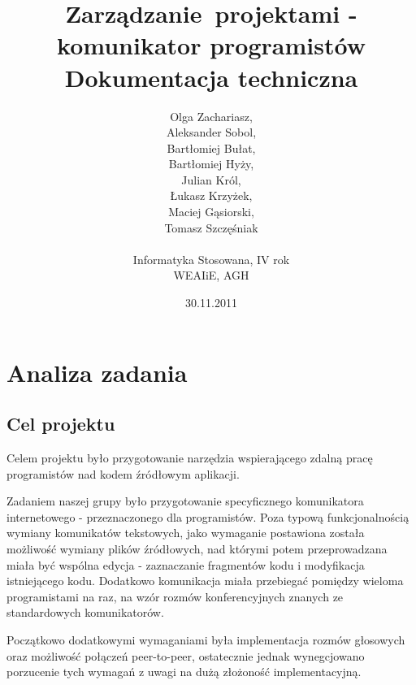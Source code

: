 \documentclass[polish,11pt,a4paper,twoside]{article}
\begin{document}
\pagestyle{fancy}
\fancyhf{} %
\fancyfoot[R]{\footnotesize \thepage}
\renewcommand{\headrulewidth}{0pt}
\renewcommand{\footrulewidth}{0pt}

\author{Olga Zachariasz,\\Aleksander Sobol,\\Bartłomiej Bułat,\\Bartłomiej Hyży,\\Julian Król,\\Łukasz Krzyżek,\\Maciej Gąsiorski,\\Tomasz Szczęśniak\\\\Informatyka Stosowana, IV rok\\WEAIiE, AGH}
\date{30.11.2011}
\title{Zarządzanie~projektami - komunikator programistów\\Dokumentacja techniczna}
\maketitle

\tableofcontents
\pagebreak

\thispagestyle{fancy}

\section{Analiza zadania}

\subsection{Cel projektu}

Celem projektu było przygotowanie narzędzia wspierającego zdalną pracę programistów nad kodem źródłowym aplikacji.

Zadaniem naszej grupy było przygotowanie specyficznego komunikatora internetowego - przeznaczonego dla programistów. Poza typową funkcjonalnością wymiany komunikatów tekstowych, jako wymaganie postawiona została możliwość wymiany plików źródłowych, nad którymi potem przeprowadzana miała być wspólna edycja - zaznaczanie fragmentów kodu i modyfikacja istniejącego kodu. Dodatkowo komunikacja miała przebiegać pomiędzy wieloma programistami na raz, na wzór rozmów konferencyjnych znanych ze standardowych komunikatorów.

Początkowo dodatkowymi wymaganiami była implementacja rozmów głosowych oraz możliwość połączeń peer-to-peer, ostatecznie jednak wynegcjowano porzucenie tych wymagań z uwagi na dużą złożoność implementacyjną.
\end{document}
